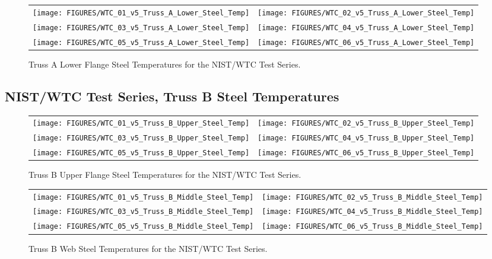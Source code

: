 \begin{figure}[p]
\begin{tabular*}{\textwidth}{l@{\extracolsep{\fill}}r}
\texttt{[image: FIGURES/WTC\_01\_v5\_Truss\_A\_Lower\_Steel\_Temp]} &
\texttt{[image: FIGURES/WTC\_02\_v5\_Truss\_A\_Lower\_Steel\_Temp]} \\
\texttt{[image: FIGURES/WTC\_03\_v5\_Truss\_A\_Lower\_Steel\_Temp]} &
\texttt{[image: FIGURES/WTC\_04\_v5\_Truss\_A\_Lower\_Steel\_Temp]} \\
\texttt{[image: FIGURES/WTC\_05\_v5\_Truss\_A\_Lower\_Steel\_Temp]} &
\texttt{[image: FIGURES/WTC\_06\_v5\_Truss\_A\_Lower\_Steel\_Temp]}
\end{tabular*}
\caption{Truss A Lower Flange Steel Temperatures for the NIST/WTC Test Series.}
\label{NIST_WTC_Truss_A_Lower_Steel}
\end{figure}

\clearpage


\subsection{NIST/WTC Test Series, Truss B Steel Temperatures}

\vspace{1in}

\begin{figure}[h!]
\begin{tabular*}{\textwidth}{l@{\extracolsep{\fill}}r}
\texttt{[image: FIGURES/WTC\_01\_v5\_Truss\_B\_Upper\_Steel\_Temp]} &
\texttt{[image: FIGURES/WTC\_02\_v5\_Truss\_B\_Upper\_Steel\_Temp]} \\
\texttt{[image: FIGURES/WTC\_03\_v5\_Truss\_B\_Upper\_Steel\_Temp]} &
\texttt{[image: FIGURES/WTC\_04\_v5\_Truss\_B\_Upper\_Steel\_Temp]} \\
\texttt{[image: FIGURES/WTC\_05\_v5\_Truss\_B\_Upper\_Steel\_Temp]} &
\texttt{[image: FIGURES/WTC\_06\_v5\_Truss\_B\_Upper\_Steel\_Temp]}
\end{tabular*}
\caption{Truss B Upper Flange Steel Temperatures for the NIST/WTC Test Series.}
\label{NIST_WTC_Truss_B_Upper_Steel}
\end{figure}

\begin{figure}[p]
\begin{tabular*}{\textwidth}{l@{\extracolsep{\fill}}r}
\texttt{[image: FIGURES/WTC\_01\_v5\_Truss\_B\_Middle\_Steel\_Temp]} &
\texttt{[image: FIGURES/WTC\_02\_v5\_Truss\_B\_Middle\_Steel\_Temp]} \\
\texttt{[image: FIGURES/WTC\_03\_v5\_Truss\_B\_Middle\_Steel\_Temp]} &
\texttt{[image: FIGURES/WTC\_04\_v5\_Truss\_B\_Middle\_Steel\_Temp]} \\
\texttt{[image: FIGURES/WTC\_05\_v5\_Truss\_B\_Middle\_Steel\_Temp]} &
\texttt{[image: FIGURES/WTC\_06\_v5\_Truss\_B\_Middle\_Steel\_Temp]}
\end{tabular*}
\caption{Truss B Web Steel Temperatures for the NIST/WTC Test Series.}
\label{NIST_WTC_Truss_B_Middle_Steel}
\end{figure}

